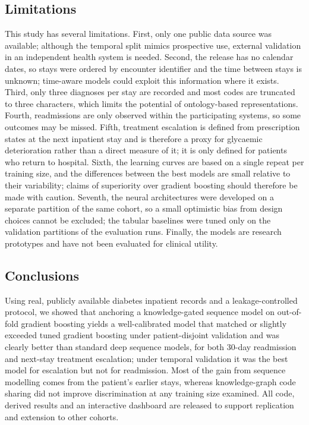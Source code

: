 \subsection{Limitations}
This study has several limitations. First, only one public data source was
available; although the temporal split mimics prospective use,
external validation in an independent health system is needed. Second, the
release has no calendar dates, so stays were ordered by encounter identifier
and the time between stays is unknown; time-aware models could exploit
this information where it exists. Third, only three diagnoses per stay are
recorded and most codes are truncated to three characters, which limits the
potential of ontology-based representations. Fourth, readmissions are only
observed within the participating systems, so some outcomes may be missed.
Fifth, treatment escalation is defined from prescription states at the next
inpatient stay and is therefore a proxy for glycaemic deterioration rather
than a direct measure of it; it is only defined for patients who return to
hospital. Sixth, the learning curves are based on a single repeat per
training size, and the differences between the best models are small
relative to their variability; claims of superiority over gradient boosting
should therefore be made with caution. Seventh, the neural architectures
were developed on a separate partition of the same cohort, so a small
optimistic bias from design choices cannot be excluded; the tabular
baselines were tuned only on the validation partitions of the evaluation
runs. Finally, the models are research
prototypes and have not been evaluated for clinical utility.

\subsection{Conclusions}
Using real, publicly available diabetes inpatient records and a
leakage-controlled protocol, we showed that anchoring a knowledge-gated
sequence model on out-of-fold gradient boosting yields a well-calibrated
model that matched or slightly exceeded tuned gradient boosting under
patient-disjoint validation and was clearly better than standard deep
sequence models, for both 30-day readmission and next-stay treatment
escalation; under temporal validation it was the best model for escalation
but not for readmission. Most of the gain from
sequence modelling comes from the patient's earlier stays, whereas
knowledge-graph code sharing did not improve discrimination at any training
size examined. All code, derived results and an
interactive dashboard are released to support replication and extension to
other cohorts.
